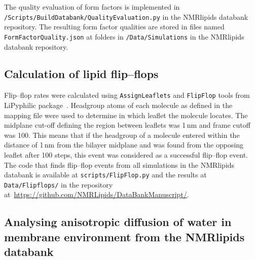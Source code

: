 \documentclass[fleqn,10pt]{wlscirep}
\begin{document}
The quality evaluation of form factors is implemented in \texttt{/Scripts/BuildDatabank/QualityEvaluation.py} in the NMRlipids databank repository. The resulting form factor qualities are stored in files named \texttt{FormFactorQuality.json} at folders in \texttt{/Data/Simulations} in the NMRlipids databank repository.


\subsection{Calculation of lipid flip--flops}
Flip--flop rates were calculated using \texttt{AssignLeaflets} and \texttt{FlipFlop} tools from LiPyphilic package~\cite{LiPyphilic2021}. Headgroup atoms of each molecule as defined in the mapping file were used to determine in which leaflet the molecule locates. The midplane cut-off defining the region between leaflets was 1\,nm and frame cutoff was 100. This means that if the headgroup of a molecule entered within the distance of 1\,nm from the bilayer midplane and was found from the opposing leaflet after 100 steps, this event was considered as a successful flip--flop event. The code that finds flip--flop events from all simulations in the NMRlipids databank is available at \texttt{scripts/FlipFlop.py} and the results at \texttt{Data/Flipflops/} in the repository at~\url{https://github.com/NMRLipids/DataBankManuscript/}. 


\subsection{Analysing anisotropic diffusion of water in membrane environment from the NMRlipids databank}


\end{document}
